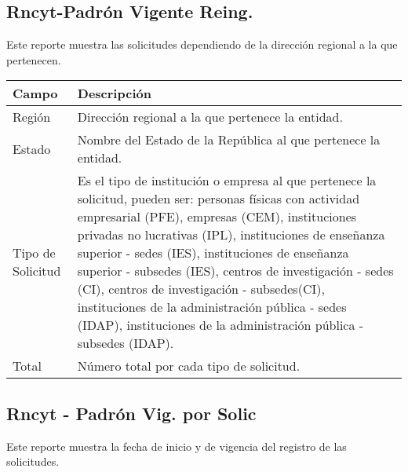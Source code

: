 \subsection{Rncyt-Padrón Vigente Reing.}
\label{appendix:Reportes:PeopleSoft:RncytPadronVigenteReing}

Este reporte muestra las solicitudes dependiendo de la dirección regional a la que pertenecen.\\

\begin{tabular}{ m{} m{}  }%
	\rowcolor{gray1} {\bf Campo} &  {\bf Descripción} \\ \hline \hline

	Región & Dirección regional a la que pertenece la entidad.\\
	\rowcolor{gray1}Estado & Nombre del Estado de la República al que pertenece la entidad.\\
	Tipo de Solicitud & Es el tipo de institución o empresa al que pertenece la solicitud, pueden ser: personas físicas con actividad empresarial (PFE), empresas (CEM), instituciones privadas no lucrativas (IPL), instituciones de enseñanza superior - sedes (IES), instituciones de enseñanza superior - subsedes (IES), centros de investigación - sedes (CI), centros de investigación - subsedes(CI), instituciones de la administración pública - sedes (IDAP), instituciones de la administración pública - subsedes (IDAP).\\
	\rowcolor{gray1}Total & Número total por cada tipo de solicitud.\\
\end{tabular}


\subsection{Rncyt - Padrón Vig. por Solic}
\label{appendix:Reportes:PeopleSoft:PadronVigSol}

Este reporte muestra la fecha de inicio y de vigencia del registro de las solicitudes.\\

